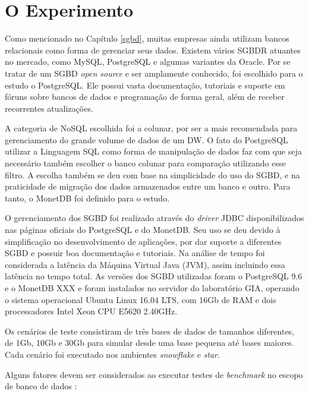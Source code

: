 \graphicspath{ {6-Experimento/} }

\chapter{O Experimento}

Como mencionado no Capítulo \ref{sgbd}, muitas empresas ainda utilizam 
bancos relacionais como forma de gerenciar seus dados. Existem vários SGBDR 
atuantes no mercado, como MySQL, PostgreSQL e algumas variantes da Oracle. 
Por se tratar de um SGBD \textit{open source} e ser amplamente 
conhecido, foi escolhido para o estudo o PostgreSQL. Ele possui vasta 
documentação, tutoriais e suporte em fóruns sobre bancos de dados e 
programação de forma geral, além de receber recorrentes atualizações. 

A categoria de NoSQL escolhida foi a colunar, por ser a mais 
recomendada para gerenciamento do grande volume de dados de um DW. 
O fato do PostgreSQL utilizar a Linguagem SQL como forma de 
manipulação de dados faz com que seja necessário também escolher 
o banco colunar para comparação utilizando esse filtro. A escolha também 
se deu com base na simplicidade do uso do SGBD, e na praticidade de 
migração dos dados armazenados entre um banco e outro. Para tanto, 
o MonetDB foi definido para o estudo.

O gerenciamento dos SGBD foi realizado através do \textit{driver} JDBC 
disponibilizados nas páginas oficiais do PostgreSQL e do MonetDB. Seu uso se deu 
devido à simplificação no desenvolvimento de aplicações, por dar suporte a 
diferentes SGBD e possuir boa documentação e tutoriais. Na análise de tempo 
foi considerada a latência da Máquina Virtual Java (JVM), assim incluindo essa 
latência no tempo total. As versões dos SGBD utilizadas 
foram o PostgreSQL 9.6 e o MonetDB XXX e foram instalados no servidor do laboratório GIA, operando o 
sistema operacional Ubuntu Linux 16.04 LTS, com 16Gb de RAM e dois 
processadores Intel Xeon CPU E5620 2.40GHz.

Os cenários de teste consistiram de três bases de dados de tamanhos 
diferentes, de 1Gb, 10Gb e 30Gb para simular desde uma base pequena 
até bases maiores. Cada cenário foi executado nos ambientes \textit{snowflake} e 
\textit{star}.

Alguns fatores devem ser considerados ao executar testes de \textit{benchmark} 
no escopo de banco de dados \cite{raasveldt2018fair}:

